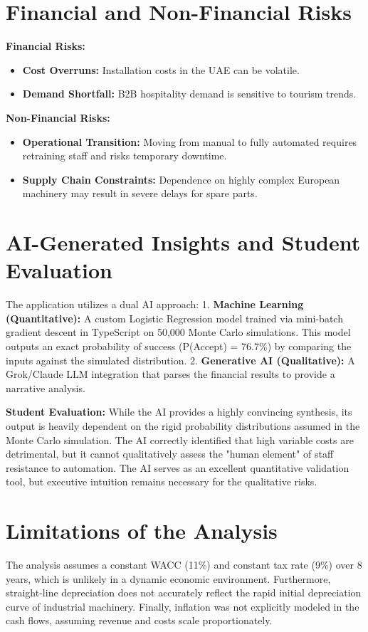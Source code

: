 \documentclass[12pt]{article}
\begin{document}
\section{Financial and Non-Financial Risks}
\textbf{Financial Risks:}
\begin{itemize}
    \item \textbf{Cost Overruns:} Installation costs in the UAE can be volatile.
    \item \textbf{Demand Shortfall:} B2B hospitality demand is sensitive to tourism trends.
\end{itemize}
\textbf{Non-Financial Risks:}
\begin{itemize}
    \item \textbf{Operational Transition:} Moving from manual to fully automated requires retraining staff and risks temporary downtime.
    \item \textbf{Supply Chain Constraints:} Dependence on highly complex European machinery may result in severe delays for spare parts.
\end{itemize}

\section{AI-Generated Insights and Student Evaluation}
The application utilizes a dual AI approach:
1. \textbf{Machine Learning (Quantitative):} A custom Logistic Regression model trained via mini-batch gradient descent in TypeScript on 50,000 Monte Carlo simulations. This model outputs an exact probability of success (P(Accept) = 76.7\%) by comparing the inputs against the simulated distribution.
2. \textbf{Generative AI (Qualitative):} A Grok/Claude LLM integration that parses the financial results to provide a narrative analysis.

\textbf{Student Evaluation:} While the AI provides a highly convincing synthesis, its output is heavily dependent on the rigid probability distributions assumed in the Monte Carlo simulation. The AI correctly identified that high variable costs are detrimental, but it cannot qualitatively assess the "human element" of staff resistance to automation. The AI serves as an excellent quantitative validation tool, but executive intuition remains necessary for the qualitative risks.

\section{Limitations of the Analysis}
The analysis assumes a constant WACC (11\%) and constant tax rate (9\%) over 8 years, which is unlikely in a dynamic economic environment. Furthermore, straight-line depreciation does not accurately reflect the rapid initial depreciation curve of industrial machinery. Finally, inflation was not explicitly modeled in the cash flows, assuming revenue and costs scale proportionately.
\end{document}
